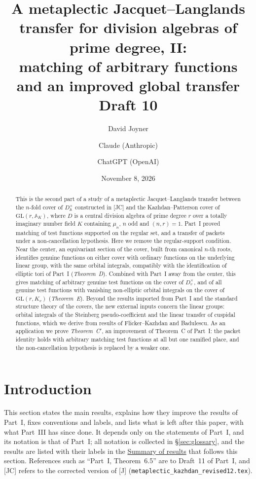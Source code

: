 \documentclass[12pt]{article}
\title{A metaplectic Jacquet--Langlands transfer for division algebras of prime degree, II:\\ matching of arbitrary functions and an improved global transfer\\[0.4em]\normalsize Draft 10}
\author{David Joyner \and Claude (Anthropic) \and ChatGPT (OpenAI)}
\date{November 8, 2026}
\newcommand{\A}{\mathbb{A}}
\newcommand{\GL}{\mathrm{GL}}
\theoremstyle{plain}
\theoremstyle{definition}
\begin{document}
\maketitle

\begin{abstract}
This is the second part of a study of a metaplectic Jacquet--Langlands transfer between the $n$-fold cover of $D^\times_{\A}$ constructed in [JC] and the Kazhdan--Patterson cover of $\GL(r,\A_K)$, where $D$ is a central division algebra of prime degree $r$ over a totally imaginary number field $K$ containing $\mu_n$, $n$ odd and $(n,r)=1$. Part~I proved matching of test functions supported on the regular set, and a transfer of packets under a non-cancellation hypothesis. Here we remove the regular-support condition. Near the center, an equivariant section of the cover, built from canonical $n$-th roots, identifies genuine functions on either cover with ordinary functions on the underlying linear group, with the same orbital integrals, compatibly with the identification of elliptic tori of Part~I (\emph{Theorem~D}). Combined with Part~I away from the center, this gives matching of arbitrary genuine test functions on the cover of $D_v^\times$, and of all genuine test functions with vanishing non-elliptic orbital integrals on the cover of $\GL(r,K_v)$ (\emph{Theorem~E}). Beyond the results imported from Part~I and the standard structure theory of the covers, the new external inputs concern the linear groups: orbital integrals of the Steinberg pseudo-coefficient and the linear transfer of cuspidal functions, which we derive from results of Flicker--Kazhdan and Badulescu. As an application we prove \emph{Theorem~C$'$}, an improvement of Theorem~C of Part~I: the packet identity holds with arbitrary matching test functions at all but one ramified place, and the non-cancellation hypothesis is replaced by a weaker one.
\end{abstract}

\tableofcontents

\section{Introduction}\label{sec:intro}
This section states the main results, explains how they improve the results of Part~I, fixes conventions and labels, and lists what is left after this paper, with what Part~III has since done. It depends only on the statements of Part~I, and its notation is that of Part~I; all notation is collected in \S\ref{sec:glossary}, and the results are listed with their labels in the \hyperref[sec:summary]{Summary of results} that follows this section. References such as ``Part~I, Theorem~6.5'' are to Draft~11 of Part~I, and [JC] refers to the corrected version of [J] (\texttt{metaplectic\_kazhdan\_revised12.tex}).
\end{document}
